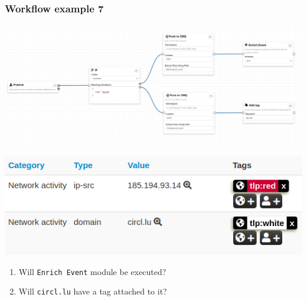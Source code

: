 \begin{frame}
    \frametitle{Workflow example 7}
    \vspace{-2em}
    \begin{center}
        \includegraphics[width=1.05\linewidth]{pictures/example-7.png}
    \end{center}
    \begin{center}
        \includegraphics[width=0.45\linewidth]{pictures/event-1.png}
    \end{center}
    \begin{enumerate}
        \item Will \texttt{Enrich Event} module be executed?
        \item Will \texttt{circl.lu} have a tag attached to it?
    \end{enumerate}
\end{frame}
